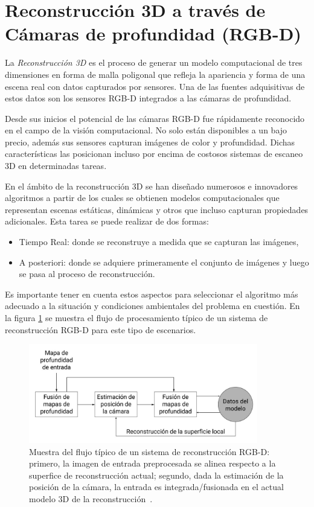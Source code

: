\section{Reconstrucción 3D a través de Cámaras de profundidad (RGB-D)}\label{section:rec3d}

La \textit{Reconstrucción 3D} es el proceso de generar un modelo computacional de tres dimensiones en forma de malla poligonal que refleja la apariencia y forma de una escena real con datos capturados por sensores. Una de las fuentes adquisitivas de estos datos son los sensores RGB-D integrados a las cámaras de profundidad.

Desde sus inicios el potencial de las cámaras RGB-D fue rápidamente reconocido en el campo de la visión computacional. No solo están disponibles a un bajo precio, además sus sensores capturan imágenes de color y profundidad. Dichas características las posicionan incluso por encima de costosos sistemas de escaneo 3D en determinadas tareas.

En el ámbito de la reconstrucción 3D se han diseñado numerosos e innovadores algoritmos a partir de los cuales se obtienen modelos computacionales que representan escenas estáticas, dinámicas y otros que incluso capturan propiedades adicionales. Esta tarea se puede realizar de dos formas:
\begin{itemize}
	\item Tiempo Real: donde se reconstruye  a medida que se capturan las imágenes,
	\item A posteriori: donde se adquiere primeramente el conjunto de imágenes y luego se pasa al proceso de reconstrucción.
\end{itemize}

Es importante tener en cuenta estos aspectos para seleccionar el algoritmo más adecuado a la situación y condiciones ambientales del problema en cuestión. En la figura \ref{fig:r3d} se muestra el flujo de procesamiento típico de un sistema de reconstrucción RGB-D para este tipo de escenarios.

\begin{figure}[ht]
	\centering
	\includegraphics[width=10cm]{./Graphics/r3d.png}
	\caption{Muestra del flujo típico de un sistema de reconstrucción RGB-D: primero, la imagen de entrada preprocesada se alinea respecto a la superfice de reconstrucción actual; segundo, dada la estimación de la posición de la cámara, la entrada es integrada/fusionada en el actual modelo 3D de la reconstrucción~\cite{zollhofer2018state}.}
	\label{fig:r3d}
\end{figure}

